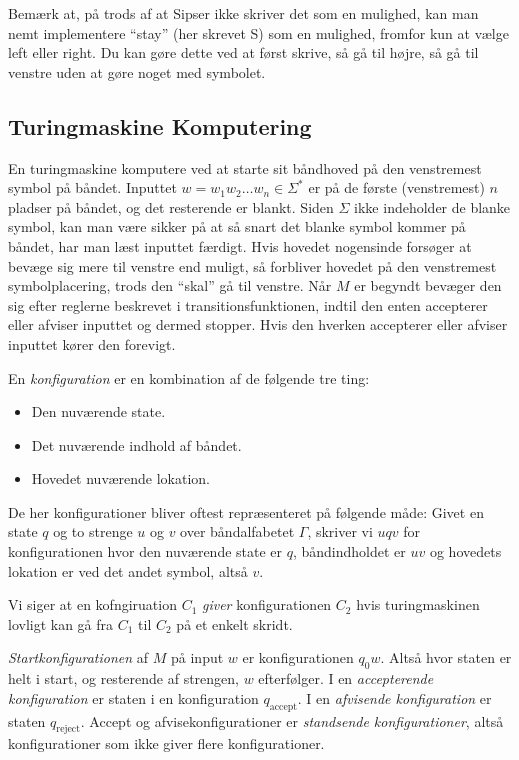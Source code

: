 Bemærk at, på trods af at Sipser ikke skriver det som en mulighed, kan man nemt implementere ``stay'' (her skrevet S) som en mulighed, fromfor kun at vælge left eller right. Du kan gøre dette ved at først skrive, så gå til højre, så gå til venstre uden at gøre noget med symbolet.

\subsection{Turingmaskine Komputering}%
\label{subsec:turingmaskinekomputering}

En turingmaskine komputere ved at starte sit båndhoved på den venstremest symbol på båndet. Inputtet $w = w_{1}w_{2} \ldots w_{n} \in \Sigma^{*}$ er på de første (venstremest) $n$ pladser på båndet, og det resterende er blankt. Siden $\Sigma$ ikke indeholder de blanke symbol, kan man være sikker på at så snart det blanke symbol kommer på båndet, har man læst inputtet færdigt. Hvis hovedet nogensinde forsøger at bevæge sig mere til venstre end muligt, så forbliver hovedet på den venstremest symbolplacering, trods den ``skal'' gå til venstre. Når $M$ er begyndt bevæger den sig efter reglerne beskrevet i transitionsfunktionen, indtil den enten accepterer eller afviser inputtet og dermed stopper. Hvis den hverken accepterer eller afviser inputtet kører den forevigt.

En \textit{konfiguration} er en kombination af de følgende tre ting:
\begin{itemize}
  \item Den nuværende state.
  \item Det nuværende indhold af båndet.
  \item Hovedet nuværende lokation.
\end{itemize}

De her konfigurationer bliver oftest repræsenteret på følgende måde: Givet en state $q$ og to strenge $u$ og $v$ over båndalfabetet $\Gamma$, skriver vi $uqv$ for konfigurationen hvor den nuværende state er $q$, båndindholdet er $uv$ og hovedets lokation er ved det andet symbol, altså $v$.

Vi siger at en kofngiruation $C_{1}$ \textit{giver} konfigurationen $C_{2}$ hvis turingmaskinen lovligt kan gå fra $C_{1}$ til $C_{2}$ på et enkelt skridt.

\textit{Startkonfigurationen} af $M$ på input $w$ er konfigurationen $q_{0}w$. Altså hvor staten er helt i start, og resterende af strengen, $w$ efterfølger. I en \textit{accepterende konfiguration} er staten i en konfiguration $q_{\text{accept}}$. I en \textit{afvisende konfiguration} er staten $q_{\text{reject}}$. Accept og afvisekonfigurationer er \textit{standsende konfigurationer}, altså konfigurationer som ikke giver flere konfigurationer.

